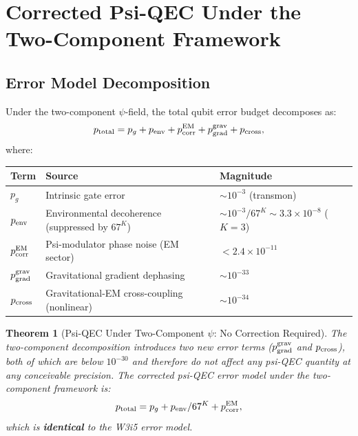 \documentclass[11pt]{article}
\newtheorem{theorem}{Theorem}[section]
\theoremstyle{definition}
\theoremstyle{remark}
\newcommand{\ee}[1]{\times 10^{#1}}
\begin{document}
\section{Corrected Psi-QEC Under the Two-Component Framework}
\label{sec:corrected-psi-qec}

\subsection{Error Model Decomposition}
\label{sec:error-decomposition}

Under the two-component $\psi$-field, the total qubit error budget
decomposes as:
\begin{equation}
  p_{\rm total} = p_g + p_{\rm env} + p_{\rm corr}^{\rm EM}
  + p_{\rm grad}^{\rm grav} + p_{\rm cross},
  \label{eq:error-budget-two-comp}
\end{equation}
where:
\begin{center}
\begin{tabular}{lll}
\toprule
Term & Source & Magnitude \\
\midrule
$p_g$ & Intrinsic gate error & $\sim 10^{-3}$ (transmon) \\
$p_{\rm env}$ & Environmental decoherence (suppressed by $67^K$) &
  $\sim 10^{-3}/67^K \sim 3.3\ee{-8}$ ($K=3$) \\
$p_{\rm corr}^{\rm EM}$ & Psi-modulator phase noise (EM sector) &
  $< 2.4\ee{-11}$ \\
$p_{\rm grad}^{\rm grav}$ & Gravitational gradient dephasing &
  $\sim 10^{-33}$ \\
$p_{\rm cross}$ & Gravitational-EM cross-coupling (nonlinear) &
  $\sim 10^{-34}$ \\
\bottomrule
\end{tabular}
\end{center}

\begin{theorem}[Psi-QEC Under Two-Component $\psi$: No Correction Required]
\label{thm:psi-qec-unchanged}
The two-component decomposition introduces two new error terms
($p_{\rm grad}^{\rm grav}$ and $p_{\rm cross}$), both of which are
below $10^{-30}$ and therefore do not affect any psi-QEC quantity at
any conceivable precision.  The corrected psi-QEC error model under
the two-component framework is:
\begin{equation}
  p_{\rm total} = p_g + p_{\rm env}/67^K + p_{\rm corr}^{\rm EM},
\end{equation}
which is \textbf{identical} to the W3i5 error model.
\end{theorem}
\end{document}
